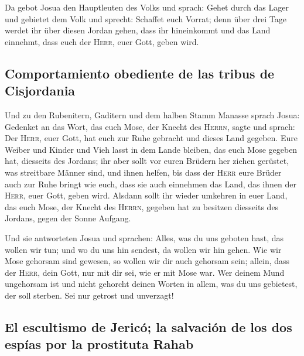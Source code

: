  Da gebot Josua den Hauptleuten des Volks und sprach:
 Gehet durch das Lager und gebietet dem Volk und sprecht:
Schaffet euch Vorrat; denn über drei Tage werdet ihr über diesen Jordan
gehen, dass ihr hineinkommt und das Land einnehmt, dass euch der
\textsc{Herr}, euer Gott, geben wird.

\hypertarget{comportamiento-obediente-de-las-tribus-de-cisjordania}{%
\subsection{Comportamiento obediente de las tribus de
Cisjordania}\label{comportamiento-obediente-de-las-tribus-de-cisjordania}}

 Und zu den Rubenitern, Gaditern und dem halben Stamm
Manasse sprach Josua:  Gedenket an das Wort, das euch
Mose, der Knecht des \textsc{Herrn}, sagte und sprach: Der
\textsc{Herr}, euer Gott, hat euch zur Ruhe gebracht und dieses Land
gegeben.  Eure Weiber und Kinder und Vieh lasst in dem
Lande bleiben, das euch Mose gegeben hat, diesseits des Jordans; ihr
aber sollt vor euren Brüdern her ziehen gerüstet, was streitbare Männer
sind, und ihnen helfen,  bis dass der \textsc{Herr} eure
Brüder auch zur Ruhe bringt wie euch, dass sie auch einnehmen das Land,
das ihnen der \textsc{Herr}, euer Gott, geben wird. Alsdann sollt ihr
wieder umkehren in euer Land, das euch Mose, der Knecht des
\textsc{Herrn}, gegeben hat zu besitzen diesseits des Jordans, gegen der
Sonne Aufgang.

 Und sie antworteten Josua und sprachen: Alles, was du
uns geboten hast, das wollen wir tun; und wo du uns hin sendest, da
wollen wir hin gehen.  Wie wir Mose gehorsam sind
gewesen, so wollen wir dir auch gehorsam sein; allein, dass der
\textsc{Herr}, dein Gott, nur mit dir sei, wie er mit Mose war.
 Wer deinem Mund ungehorsam ist und nicht gehorcht deinen
Worten in allem, was du uns gebietest, der soll sterben. Sei nur getrost
und unverzagt!

\hypertarget{el-escultismo-de-jericuxf3-la-salvaciuxf3n-de-los-dos-espuxedas-por-la-prostituta-rahab}{%
\subsection{El escultismo de Jericó; la salvación de los dos espías por
la prostituta
Rahab}\label{el-escultismo-de-jericuxf3-la-salvaciuxf3n-de-los-dos-espuxedas-por-la-prostituta-rahab}}


